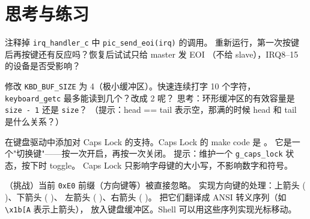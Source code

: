 \section{思考与练习}

\begin{exercise}
注释掉 \texttt{irq\_handler\_c} 中 \texttt{pic\_send\_eoi(irq)} 的调用。
重新运行，第一次按键后再按键还有反应吗？恢复后试试只给 master 发 EOI
（不给 slave），IRQ8--15 的设备是否受影响？
\end{exercise}

\begin{exercise}
修改 \texttt{KBD\_BUF\_SIZE} 为 4（极小缓冲区）。快速连续打字 10 个字符，
\texttt{keyboard\_getc} 最多能读到几个？改成 2 呢？
思考：环形缓冲区的有效容量是 \texttt{size - 1} 还是 \texttt{size}？
（提示：head == tail 表示空，那满的时候 head 和 tail 是什么关系？）
\end{exercise}

\begin{exercise}
在键盘驱动中添加对 Caps Lock 的支持。Caps Lock 的 make code 是 。
它是一个"切换键"——按一次开启，再按一次关闭。
提示：维护一个 \texttt{g\_caps\_lock} 状态，按下时 toggle。
Caps Lock 只影响字母键的大小写，不影响数字和符号。
\end{exercise}

\begin{exercise}
（挑战）当前 \texttt{0xE0} 前缀（方向键等）被直接忽略。
实现方向键的处理：上箭头 ( )、下箭头 ( )、
左箭头 ( )、右箭头 ( )。
把它们翻译成 ANSI 转义序列（如 \texttt{\textbackslash x1b[A} 表示上箭头），
放入键盘缓冲区。Shell 可以用这些序列实现光标移动。
\end{exercise}


